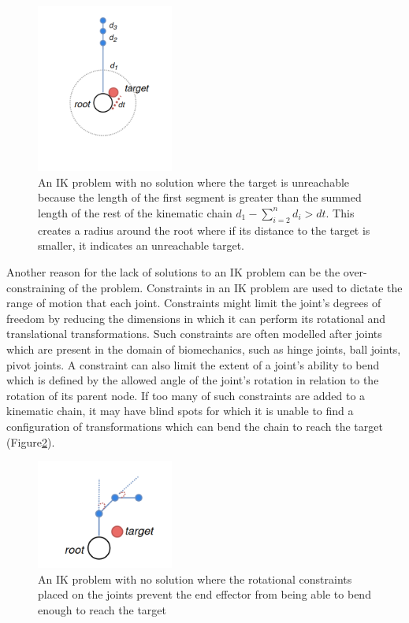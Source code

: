 \begin{figure}
    \centering
    \captionsetup{justification=centering}
    \includegraphics[width=0.4\textwidth]{grafika/unreachable_dist_2.png}
    \caption{An IK problem with no solution where the target is unreachable
    because the length of the first segment is greater than the summed length of
    the rest of the kinematic chain \(d_1 - \sum_{i=2}^{n}d_i > dt\). This creates
    a radius around the root where if its distance to the target is smaller, it
    indicates an unreachable target.  } \label{fig:unreachable_dist2}
\end{figure}

Another reason for the lack of solutions to an IK problem can be the
over-constraining of the problem. Constraints in an IK problem are used to
dictate the range of motion that each joint. Constraints might limit the joint's degrees of
freedom by reducing the dimensions in which it can perform its rotational and
translational transformations. Such constraints are often modelled after joints
which are present in the domain of biomechanics, such as hinge joints, ball
joints, pivot joints. A constraint can also limit the extent of a joint's
ability to bend which is defined by the allowed angle of the joint's rotation in
relation to the rotation of its parent node. If too many of such constraints are
added to a kinematic chain, it may have blind spots for which it is unable to
find a configuration of transformations which can bend the chain to reach the
target (Figure\ref{fig:unreachable_angles}).

\begin{figure}
    \centering
    \captionsetup{justification=centering}
    \includegraphics[width=0.4\textwidth]{grafika/unreachable_angles.png}
    \caption{An IK problem with no solution where the rotational constraints
    placed on the joints prevent the end effector from being able to bend enough
    to reach the target}
    \label{fig:unreachable_angles}
\end{figure}

